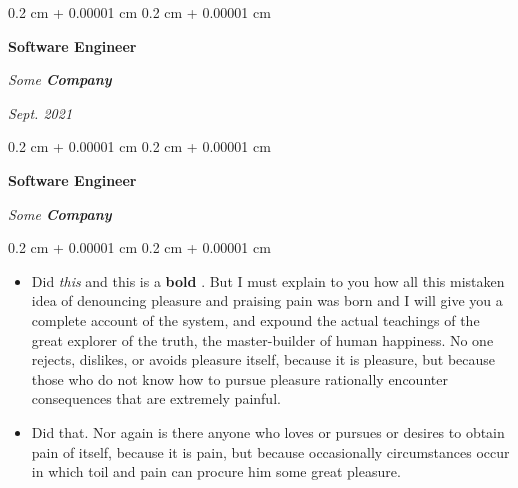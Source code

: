 \documentclass[10pt, letterpaper]{article}
\newenvironment{highlights}{
    \begin{itemize}[
        topsep=0.10 cm,
        parsep=0.10 cm,
        partopsep=0pt,
        itemsep=0pt,
        leftmargin=0.4 cm + 10pt + 0.6 cm
    ]
}{
    \end{itemize}
} %
\newenvironment{onecolentry}{
    \begin{adjustwidth}{
        0.2 cm + 0.00001 cm
    }{
        0.2 cm + 0.00001 cm
    }
}{
    \end{adjustwidth}
} %
\newenvironment{onecolentrybulleted}{
    \onecolentry
    \setcolumnwidth{0.6 cm, \fill}
    \begin{paracol}{2}
    \vspace*{\fill}
    \textbullet
    \vspace*{3px}
    \vspace*{\fill}
    \switchcolumn
}{
    \end{paracol}
    \endonecolentry
} %
\newenvironment{threecolentry}[3][]{
    \onecolentry
    \def\thirdColumn{#3}
    \setcolumnwidth{0.6 cm, \fill, 4.5 cm}
    \begin{paracol}{3}
    #2 \switchcolumn
}{
    \switchcolumn \raggedleft \thirdColumn
    \end{paracol}
    \endonecolentry
} %
\let\hrefWithoutArrow\href
\renewcommand{\href}[2]{\hrefWithoutArrow{#1}{\mbox{\ifthenelse{\equal{#2}{}}{ }{#2 }\raisebox{.15ex}{\footnotesize \faExternalLink*}}}}
\begin{document}
        \vspace{0.2 cm-3px}

        \begin{threecolentry}{
            \vspace*{\fill}
            \textbullet
            \vspace*{3px}
            \vspace*{\fill}
        }{
            
            
        \textit{Sept. 2021}}
            \textbf{Software Engineer}
            
            \textit{Some \textbf{Company}}
        \end{threecolentry}



        \vspace{0.2 cm-3px}

        \begin{onecolentrybulleted}
            \textbf{Software Engineer}
            
            \textit{Some \textbf{Company}}
        \end{onecolentrybulleted}

        \vspace{0.10 cm-3px}
        \begin{onecolentry}
            \begin{highlights}
                \item Did \textit{this} and this is a \textbf{bold} \href{https://example.com}{link}. But I must explain to you how all this mistaken idea of denouncing pleasure and praising pain was born and I will give you a complete account of the system, and expound the actual teachings of the great explorer of the truth, the master-builder of human happiness. No one rejects, dislikes, or avoids pleasure itself, because it is pleasure, but because those who do not know how to pursue pleasure rationally encounter consequences that are extremely painful.
                \item Did that. Nor again is there anyone who loves or pursues or desires to obtain pain of itself, because it is pain, but because occasionally circumstances occur in which toil and pain can procure him some great pleasure.
            \end{highlights}
        \end{onecolentry}


        \vspace{0.2 cm-3px}
\end{document}
